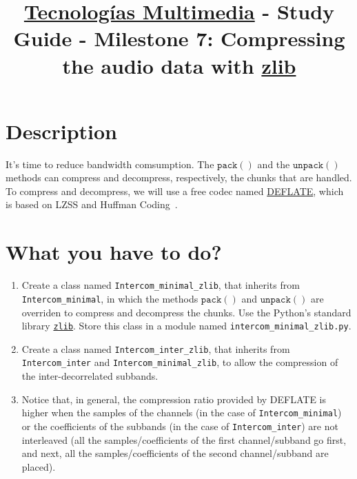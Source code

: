 \title{\href{https://www.ual.es/estudios/grados/presentacion/plandeestudios/asignatura/4015/40154321?idioma=zh_CN}{Tecnologías Multimedia} - Study Guide - Milestone 7: Compressing the audio data with \href{https://zlib.net/}{zlib}}

\maketitle

\section{Description}

It's time to reduce bandwidth comsumption. The $\mathtt{pack()}$ and
the $\mathtt{unpack()}$ methods can compress and decompress,
respectively, the chunks that are handled. To compress and decompress,
we will use a free codec named
\href{https://en.wikipedia.org/wiki/DEFLATE}{DEFLATE}, which is based
on LZSS and Huffman Coding~\cite{nelson96datacompression}.

\section{What you have to do?}

\begin{enumerate}
\item Create a class named \texttt{Intercom\_minimal\_zlib}, that
  inherits from \texttt{Intercom\_minimal}, in which the methods
  $\mathtt{pack()}$ and $\mathtt{unpack()}$ are overriden to compress
  and decompress the chunks. Use the Python's standard library
  \href{https://docs.python.org/3/library/zlib.html}{\texttt{zlib}}. Store
  this class in a module named \texttt{intercom\_minimal\_zlib.py}.
\item Create a class named \texttt{Intercom\_inter\_zlib}, that
  inherits from \texttt{Intercom\_inter} and
  \texttt{Intercom\_minimal\_zlib}, to allow the compression of the
  inter-decorrelated subbands.
\item Notice that, in general, the compression ratio provided by
  DEFLATE is higher when the samples of the channels (in the case of
  \texttt{Intercom\_minimal}) or the coefficients of the subbands (in
  the case of \texttt{Intercom\_inter}) are not interleaved (all the
  samples/coefficients of the first channel/subband go first, and
  next, all the samples/coefficients of the second channel/subband are
  placed).
\end{enumerate}

